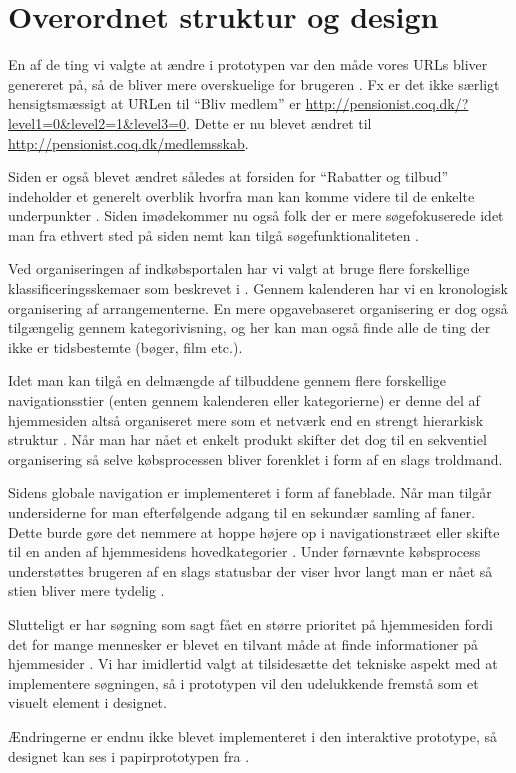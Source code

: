 \chapter{Overordnet struktur og design}

En af de ting vi valgte at ændre i prototypen var den
måde vores URLs bliver genereret på, så de bliver mere
overskuelige for brugeren \cite[s.~385]{Benyon2010}. Fx er det
ikke særligt hensigtsmæssigt at URLen til ``Bliv medlem'' er
\url{http://pensionist.coq.dk/?level1=0&level2=1&level3=0}. Dette er nu blevet
ændret til \url{http://pensionist.coq.dk/medlemsskab}.

Siden er også blevet ændret således at forsiden for ``Rabatter og tilbud''
indeholder et generelt overblik hvorfra man kan komme videre til de enkelte
underpunkter \cite[s.~386]{Benyon2010}. Siden imødekommer nu også folk der
er mere søgefokuserede idet man fra ethvert sted på siden nemt kan tilgå
søgefunktionaliteten \cite[s. 386]{Benyon2010}.

Ved organiseringen af indkøbsportalen har vi valgt at bruge flere forskellige
klassificeringsskemaer som beskrevet i \cite[s.~392--394]{Benyon2010}.
Gennem kalenderen har vi en kronologisk organisering af arrangementerne.
En mere opgavebaseret organisering er dog også tilgængelig gennem
kategorivisning, og her kan man også finde alle de ting der ikke er
tidsbestemte (bøger, film etc.).

Idet man kan tilgå en delmængde af tilbuddene gennem flere forskellige
navigationsstier (enten gennem kalenderen eller kategorierne) er denne del af
hjemmesiden altså organiseret mere som et netværk end en strengt hierarkisk
struktur \cite[s.~396]{Benyon2010}. Når man har nået et enkelt produkt
skifter det dog til en sekventiel organisering så selve købsprocessen bliver
forenklet i form af en slags troldmand.

Sidens globale navigation er implementeret i form af faneblade. Når
man tilgår undersiderne for man efterfølgende adgang til en sekundær
samling af faner. Dette burde gøre det nemmere at hoppe højere op i
navigationstræet eller skifte til en anden af hjemmesidens hovedkategorier
\cite[s.~402]{Benyon2010}. Under førnævnte købsprocess understøttes
brugeren af en slags statusbar der viser hvor langt man er nået så stien
bliver mere tydelig \cite[s.~403]{Benyon2010}.

Slutteligt er har søgning som sagt fået en større prioritet på
hjemmesiden fordi det for mange mennesker er blevet en tilvant måde at finde
informationer på hjemmesider \cite[s.~405]{Benyon2010}. Vi har imidlertid
valgt at tilsidesætte det tekniske aspekt med at implementere søgningen, så
i prototypen vil den udelukkende fremstå som et visuelt element i designet.

Ændringerne er endnu ikke blevet implementeret i den interaktive prototype,
så designet kan ses i papirprototypen fra \cite{osos}.
